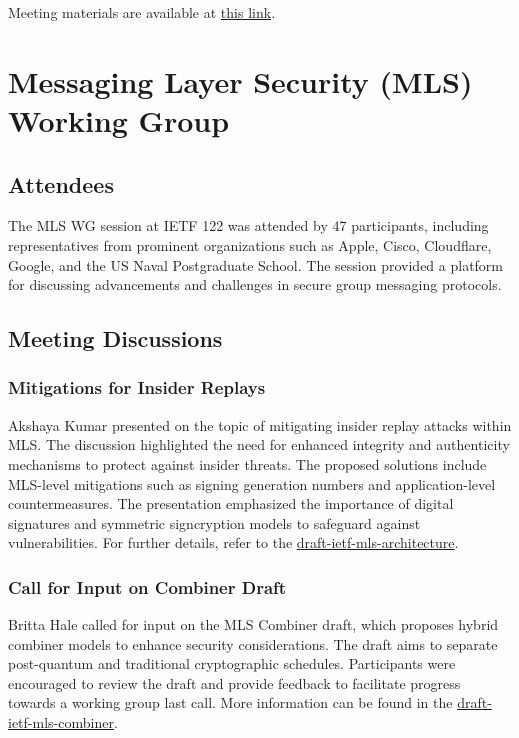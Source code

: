 \documentclass{article}
\begin{document}
Meeting materials are available at \href{https://meetings.conf.meetecho.com/ietf122/?session=33992}{this link}.




\newpage

\section{Messaging Layer Security (MLS) Working Group}

\subsection{Attendees}

The MLS WG session at IETF 122 was attended by 47 participants, including representatives from prominent organizations such as Apple, Cisco, Cloudflare, Google, and the US Naval Postgraduate School. The session provided a platform for discussing advancements and challenges in secure group messaging protocols.

\subsection{Meeting Discussions}

\subsubsection{Mitigations for Insider Replays}

Akshaya Kumar presented on the topic of mitigating insider replay attacks within MLS. The discussion highlighted the need for enhanced integrity and authenticity mechanisms to protect against insider threats. The proposed solutions include MLS-level mitigations such as signing generation numbers and application-level countermeasures. The presentation emphasized the importance of digital signatures and symmetric signcryption models to safeguard against vulnerabilities. For further details, refer to the \href{https://datatracker.ietf.org/doc/html/draft-ietf-mls-architecture}{draft-ietf-mls-architecture}.

\subsubsection{Call for Input on Combiner Draft}

Britta Hale called for input on the MLS Combiner draft, which proposes hybrid combiner models to enhance security considerations. The draft aims to separate post-quantum and traditional cryptographic schedules. Participants were encouraged to review the draft and provide feedback to facilitate progress towards a working group last call. More information can be found in the \href{https://datatracker.ietf.org/doc/html/draft-ietf-mls-combiner}{draft-ietf-mls-combiner}.
\end{document}
